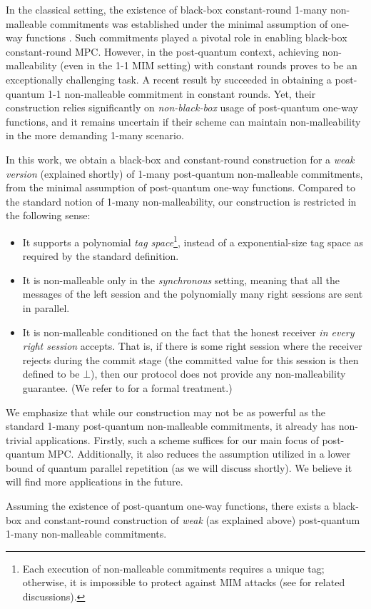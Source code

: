 In the classical setting, the existence of black-box constant-round 1-many non-malleable commitments was established under the minimal assumption of one-way functions \cite{STOC:Goyal11,FOCS:GLOV12}. Such commitments played a pivotal role in enabling black-box constant-round MPC. However, in the post-quantum context, achieving non-malleability (even in the 1-1 MIM setting) with constant rounds proves to be an exceptionally challenging task. A recent result by \cite{FOCS:LPY23} succeeded in obtaining a post-quantum 1-1 non-malleable commitment in constant rounds. Yet, their construction relies significantly on {\em non-black-box} usage of post-quantum one-way functions, and it remains uncertain if their scheme can maintain non-malleability in the more demanding 1-many scenario.


In this work, we obtain a black-box and constant-round construction for a {\em weak version} (explained shortly) of 1-many post-quantum non-malleable commitments, from the minimal assumption of post-quantum one-way functions. Compared to the standard notion of 1-many non-malleability, our construction is restricted in the following sense:
\begin{itemize}
 \item 
 It supports a polynomial {\em tag space}\footnote{Each execution of non-malleable commitments requires a unique tag; otherwise, it is impossible to protect against MIM attacks (see \cite{STOC:Pass04} for related discussions).}, instead of a exponential-size tag space as required by  the standard definition.
 \item 
It is non-malleable only in the {\em synchronous} setting, meaning that all the messages of the left session and the polynomially many right sessions are sent in parallel.
\item
It is non-malleable conditioned on the fact that the honest receiver {\em in every right session} accepts. That is, if there is some right session where the receiver rejects during the commit stage (the committed value for this session is then defined to be $\bot$), then our protocol does not provide any non-malleability guarantee. (We refer to  for a formal treatment.)
 \end{itemize} 
We emphasize that while our construction may not be as powerful as the standard 1-many post-quantum non-malleable commitments, it already has non-trivial applications. Firstly, such a scheme suffices for our main focus of post-quantum MPC. Additionally, it also reduces the assumption utilized in a lower bound of quantum parallel repetition (as we will discuss shortly). We believe it will find more applications in the future.
\begin{theorem}\label{thm:informal:1-many-NMC}
Assuming the existence of post-quantum one-way functions, there exists a black-box and constant-round construction of {\em weak} (as explained above) post-quantum 1-many non-malleable commitments.
\end{theorem}

